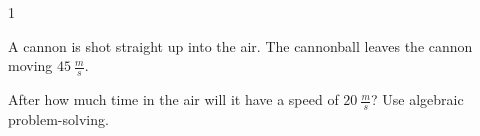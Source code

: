 
\AddToShipoutPicture*{\BackgroundPic}

\addtocounter {ProbNum} {1}

 
{\bf \Large{}} A cannon is shot straight up into the air. The cannonball leaves the cannon moving ${45~\tfrac{m}{s}}$.  

\bigskip  After how much time in the air will it have a speed of ${20~\tfrac{m}{s}}$? Use algebraic problem-solving.



\vfill
\newpage